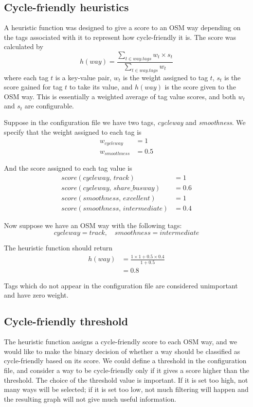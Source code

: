 \documentclass[12pt,a4paper]{report}
\begin{document}
\subsection{Cycle-friendly heuristics} \label{sec:cycle_heuristic}
A heuristic function was designed to give a score to an OSM way depending on the tags associated with it to represent how cycle-friendly it is. The score was calculated by
\begin{equation}\label{eq:heuristic}
    h(way) = \frac{\sum_{t\in way.tags} w_t \times s_t}{\sum_{t\in way.tags} w_t}
\end{equation}
where each tag $t$ is a key-value pair, $w_t$ is the weight assigned to tag $t$, $s_t$ is the score gained for tag $t$ to take its value, and $h(way)$ is the score given to the OSM way. This is essentially a weighted average of tag value scores, and both $w_t$ and $s_t$ are configurable. 

Suppose in the configuration file we have two tags, \textit{cycleway} and \textit{smoothness}. We specify that the weight assigned to each tag is
\begin{align*}
    w_{cycleway} &= 1 \\
    w_{smoothness} &= 0.5
\end{align*}

And the score assigned to each tag value is
\begin{align*}
    score(cycleway,\, track) &= 1 \\
    score(cycleway,\, share\_busway) &= 0.6 \\
    score(smoothness,\, excellent) &= 1 \\
    score(smoothness,\, intermediate) &= 0.4
\end{align*}

Now suppose we have an OSM way with the following tags:
\[cycleway=track,\quad smoothness=intermediate\]

The heuristic function should return
\begin{align*}
    h(way) &= \frac{1\times 1 + 0.5\times 0.4}{1 + 0.5} \\
    &= 0.8
\end{align*}

Tags which do not appear in the configuration file are considered unimportant and have zero weight.

\subsection{Cycle-friendly threshold}
The heuristic function assigns a cycle-friendly score to each OSM way, and we would like to make the binary decision of whether a way should be classified as cycle-friendly based on its score. We could define a threshold in the configuration file, and consider a way to be cycle-friendly only if it gives a score higher than the threshold. The choice of the threshold value is important. If it is set too high, not many ways will be selected; if it is set too low, not much filtering will happen and the resulting graph will not give much useful information.
\end{document}
